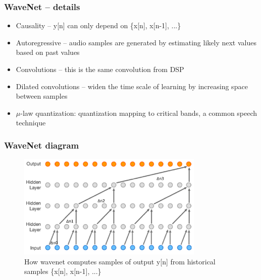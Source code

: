 \documentclass{beamer}
\begin{document}
\begin{frame}
	\frametitle{WaveNet -- details}
	\begin{itemize}
		\item
			Causality -- y[n] can only depend on \{x[n], x[n-1], ...\}
		\item
			Autoregressive -- audio samples are generated by estimating likely next values based on past values
		\item
			Convolutions -- this is the same convolution from DSP
		\item
			Dilated convolutions -- widen the time scale of learning by increasing space between samples
		\item
			$\mu$-law quantization: quantization mapping to critical bands, a common speech technique
	\end{itemize}
\end{frame}


\begin{frame}
	\frametitle{WaveNet diagram}
	\begin{figure}
	\includegraphics[height=5cm]{./7_wavenet_annot.png}
		\caption{How wavenet computes samples of output y[n] from historical samples \{x[n], x[n-1], ...\}}
	\end{figure}
\end{frame}

\end{document}
